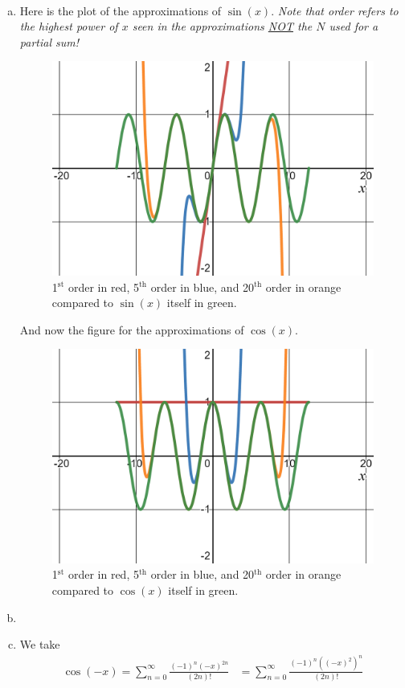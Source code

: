 \documentclass[12pt]{article} %
\begin{document}
\begin{solution}~
	\begin{enumerate}[(a)]
		\item Here is the plot of the approximations of $\sin(x)$. \emph{Note that order refers to the highest power of $x$ seen in the approximations \underline{NOT} the $N$ used for a partial sum!}
		\begin{figure}[H]
			\centering
			\includegraphics[width=.75\textwidth]{sine_approx.png}
			\caption{1$^\textrm{st}$ order in red, 5$^\textrm{th}$ order in blue, and 20$^\textrm{th}$ order in orange compared to $\sin(x)$ itself in green.}
		\end{figure}
		And now the figure for the approximations of $\cos(x)$.
		\begin{figure}[H]
			\centering
			\includegraphics[width=.75\textwidth]{cosine_approx.png}
			\caption{1$^\textrm{st}$ order in red, 5$^\textrm{th}$ order in blue, and 20$^\textrm{th}$ order in orange compared to $\cos(x)$ itself in green.}
		\end{figure}
		\item 
		\item We take
		\begin{align*}
			\cos(-x)=\sum_{n=0}^\infty \frac{(-1)^n (-x)^{2n}}{(2n)!} &= \sum_{n=0}^\infty \frac{(-1)^n \left((-x)^2\right)^n}{(2n)!}\\

\end{align*}
\end{enumerate}
\end{solution}
\end{document}
